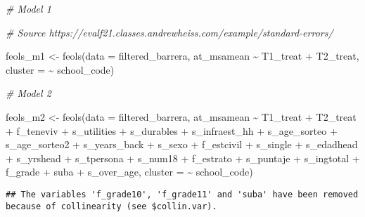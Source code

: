 \documentclass[
]{article}
\newenvironment{Shaded}{\begin{snugshade}}{\end{snugshade}}
\newcommand{\AttributeTok}[1]{\textcolor[rgb]{0.77,0.63,0.00}{#1}}
\newcommand{\CommentTok}[1]{\textcolor[rgb]{0.56,0.35,0.01}{\textit{#1}}}
\newcommand{\FunctionTok}[1]{\textcolor[rgb]{0.00,0.00,0.00}{#1}}
\newcommand{\NormalTok}[1]{#1}
\newcommand{\OtherTok}[1]{\textcolor[rgb]{0.56,0.35,0.01}{#1}}
\newcommand{\SpecialCharTok}[1]{\textcolor[rgb]{0.00,0.00,0.00}{#1}}
\begin{document}
\begin{Shaded}
\begin{Highlighting}[]
\CommentTok{\# Model 1}

\CommentTok{\# Source https://evalf21.classes.andrewheiss.com/example/standard{-}errors/}

\NormalTok{feols\_m1 }\OtherTok{\textless{}{-}} \FunctionTok{feols}\NormalTok{(}\AttributeTok{data =}\NormalTok{ filtered\_barrera,}
\NormalTok{               at\_msamean }\SpecialCharTok{\textasciitilde{}}\NormalTok{ T1\_treat }\SpecialCharTok{+}\NormalTok{ T2\_treat,}
               \AttributeTok{cluster =} \SpecialCharTok{\textasciitilde{}}\NormalTok{ school\_code)}

\CommentTok{\# Model 2}

\NormalTok{feols\_m2 }\OtherTok{\textless{}{-}} \FunctionTok{feols}\NormalTok{(}\AttributeTok{data =}\NormalTok{ filtered\_barrera, }
\NormalTok{                  at\_msamean }\SpecialCharTok{\textasciitilde{}}\NormalTok{ T1\_treat }\SpecialCharTok{+}\NormalTok{ T2\_treat }\SpecialCharTok{+}\NormalTok{ f\_teneviv }\SpecialCharTok{+}\NormalTok{ s\_utilities }\SpecialCharTok{+}\NormalTok{ s\_durables }\SpecialCharTok{+}\NormalTok{ s\_infraest\_hh }\SpecialCharTok{+}\NormalTok{ s\_age\_sorteo }\SpecialCharTok{+}\NormalTok{ s\_age\_sorteo2 }\SpecialCharTok{+}\NormalTok{ s\_years\_back }\SpecialCharTok{+}\NormalTok{ s\_sexo }\SpecialCharTok{+}\NormalTok{ f\_estcivil }\SpecialCharTok{+}\NormalTok{ s\_single }\SpecialCharTok{+}\NormalTok{ s\_edadhead }\SpecialCharTok{+}\NormalTok{ s\_yrshead }\SpecialCharTok{+}\NormalTok{ s\_tpersona }\SpecialCharTok{+}\NormalTok{ s\_num18 }\SpecialCharTok{+}\NormalTok{ f\_estrato }\SpecialCharTok{+}\NormalTok{ s\_puntaje }\SpecialCharTok{+}\NormalTok{ s\_ingtotal }\SpecialCharTok{+}\NormalTok{ f\_grade }\SpecialCharTok{+}\NormalTok{ suba }\SpecialCharTok{+}\NormalTok{ s\_over\_age,}
                  \AttributeTok{cluster =} \SpecialCharTok{\textasciitilde{}}\NormalTok{ school\_code)}
\end{Highlighting}
\end{Shaded}

\begin{verbatim}
## The variables 'f_grade10', 'f_grade11' and 'suba' have been removed because of collinearity (see $collin.var).
\end{verbatim}
\end{document}
